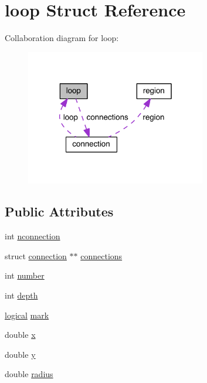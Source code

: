 \hypertarget{structloop}{\section{loop Struct Reference}
\label{structloop}
}


Collaboration diagram for loop\+:
\nopagebreak
\begin{figure}[H]
\begin{center}
\leavevmode
\includegraphics[width=223pt]{structloop__coll__graph}
\end{center}
\end{figure}
\subsection*{Public Attributes}
\begin{DoxyCompactItemize}
\item 
int \hyperlink{structloop_ac618052090293f928ddacbecc778a76c}{nconnection}
\item 
struct \hyperlink{structconnection}{connection} $\ast$$\ast$ \hyperlink{structloop_a85ed661384f3377c0a3c097420330198}{connections}
\item 
int \hyperlink{structloop_a7a839c1fed29a1dc9f486ec13b21bf99}{number}
\item 
int \hyperlink{structloop_a3ebdd99aa3fb443f33a26ac8816a8112}{depth}
\item 
\hyperlink{naview_8c_aa2627246f9b7e4e41ceaa21c3ce4d035}{logical} \hyperlink{structloop_abc3be3dad4089b9b6a81781bf979fbbe}{mark}
\item 
double \hyperlink{structloop_a83c555340d33764a979b7311888c6646}{x}
\item 
double \hyperlink{structloop_a46d7ddb88254dfc2ca248db8dd2a3680}{y}
\item 
double \hyperlink{structloop_aac247baea3825b6d13f2021b86460602}{radius}
\end{DoxyCompactItemize}


